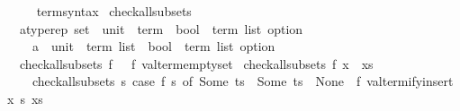 \begin{isabellebody}
\isanewline
{}\isamarkupfalse%
%
\isadelimproof
\ %
\endisadelimproof
%
\isatagproof
\isacommand{{\isachardot}{\kern0pt}{\isachardot}{\kern0pt}}\isamarkupfalse%
%
\endisatagproof
{\isafoldproof}%
%
\isadelimproof
%
\endisadelimproof
\isanewline
\isanewline
{}\isamarkupfalse%
\isanewline
\isanewline
{}\isamarkupfalse%
\isanewline
\ \ \ term{\isacharunderscore}{\kern0pt}syntax\isanewline
{}\isanewline
\isanewline
{}\isamarkupfalse%
\ check{\isacharunderscore}{\kern0pt}all{\isacharunderscore}{\kern0pt}subsets\ {\isacharcolon}{\kern0pt}{\isacharcolon}{\kern0pt}\isanewline
\ \ {\isachardoublequoteopen}{\isacharparenleft}{\kern0pt}{\isacharparenleft}{\kern0pt}{\isacharprime}{\kern0pt}a{\isacharcolon}{\kern0pt}{\isacharcolon}{\kern0pt}typerep{\isacharparenright}{\kern0pt}\ set\ {\isasymtimes}\ {\isacharparenleft}{\kern0pt}unit\ {\isasymRightarrow}\ term{\isacharparenright}{\kern0pt}\ {\isasymRightarrow}\ {\isacharparenleft}{\kern0pt}bool\ {\isasymtimes}\ term\ list{\isacharparenright}{\kern0pt}\ option{\isacharparenright}{\kern0pt}\ {\isasymRightarrow}\isanewline
\ \ \ \ {\isacharparenleft}{\kern0pt}{\isacharprime}{\kern0pt}a\ {\isasymtimes}\ {\isacharparenleft}{\kern0pt}unit\ {\isasymRightarrow}\ term{\isacharparenright}{\kern0pt}{\isacharparenright}{\kern0pt}\ list\ {\isasymRightarrow}\ {\isacharparenleft}{\kern0pt}bool\ {\isasymtimes}\ term\ list{\isacharparenright}{\kern0pt}\ option{\isachardoublequoteclose}\isanewline
{}\isanewline
\ \ {\isachardoublequoteopen}check{\isacharunderscore}{\kern0pt}all{\isacharunderscore}{\kern0pt}subsets\ f\ {\isacharbrackleft}{\kern0pt}{\isacharbrackright}{\kern0pt}\ {\isacharequal}{\kern0pt}\ f\ valterm{\isacharunderscore}{\kern0pt}emptyset{\isachardoublequoteclose}\isanewline
{\isacharbar}{\kern0pt}\ {\isachardoublequoteopen}check{\isacharunderscore}{\kern0pt}all{\isacharunderscore}{\kern0pt}subsets\ f\ {\isacharparenleft}{\kern0pt}x\ {\isacharhash}{\kern0pt}\ xs{\isacharparenright}{\kern0pt}\ {\isacharequal}{\kern0pt}\isanewline
\ \ \ \ check{\isacharunderscore}{\kern0pt}all{\isacharunderscore}{\kern0pt}subsets\ {\isacharparenleft}{\kern0pt}{\isasymlambda}s{\isachardot}{\kern0pt}\ case\ f\ s\ of\ Some\ ts\ {\isasymRightarrow}\ Some\ ts\ {\isacharbar}{\kern0pt}\ None\ {\isasymRightarrow}\ f\ {\isacharparenleft}{\kern0pt}valtermify{\isacharunderscore}{\kern0pt}insert\ x\ s{\isacharparenright}{\kern0pt}{\isacharparenright}{\kern0pt}\ xs{\isachardoublequoteclose}\isanewline
\isanewline
{}\isamarkupfalse%

\end{isabellebody}
